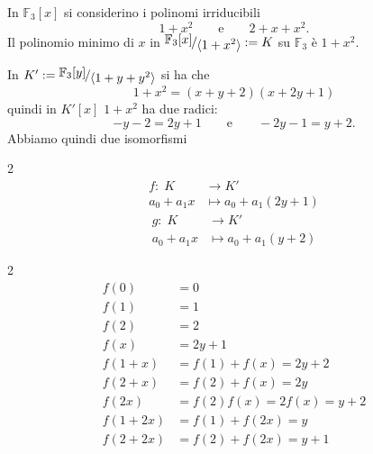 \documentclass[../main.tex]{subfiles}
\begin{document}
\begin{example}
    In $\mathbb{F}_3[x]$ si considerino i polinomi irriducibili
    \begin{equation*}
        1 + x^2 \qquad \text{e} \qquad 2 + x + x^2.
    \end{equation*}
    Il polinomio minimo di $x$ in $\nicefrac{\mathbb{F}_3[x]}{\langle 1 + x^2 \rangle} := K$ su $\mathbb{F}_3$ è $1 + x^2$.

    In $K' := \nicefrac{\mathbb{F}_3[y]}{\langle 1 + y + y^2\rangle}$ si ha che
    \begin{equation*}
        1 + x^2 = (x + y + 2)(x + 2y + 1)
    \end{equation*}
    quindi in $K'[x]$ $1 + x^2$ ha due radici:
    \begin{equation*}
        -y-2 = 2y+1 \qquad \text{e} \qquad -2y - 1 = y + 2.
    \end{equation*}
    Abbiamo quindi due isomorfismi
    \begin{multicols}{2}
        \begin{align*}
            f: \; K    & \rightarrow K'            \\
            a_0 + a_1x & \mapsto a_0 + a_1(2y + 1)
        \end{align*}
        \columnbreak
        \begin{align*}
            g: \; K    & \rightarrow K'           \\
            a_0 + a_1x & \mapsto a_0 + a_1(y + 2)
        \end{align*}
    \end{multicols}
    \begin{multicols}{2}
        \begin{align*}
            f(0)      & = 0                        \\
            f(1)      & = 1                        \\
            f(2)      & = 2                        \\
            f(x)      & = 2y + 1                   \\
            f(1 + x)  & = f(1) + f(x) = 2y + 2     \\
            f(2 + x)  & = f(2) + f(x) = 2y         \\
            f(2x)     & = f(2)f(x) = 2f(x) = y + 2 \\
            f(1 + 2x) & = f(1) + f(2x) = y         \\
            f(2 + 2x) & = f(2) + f(2x) = y + 1
        \end{align*}


\end{multicols}
\end{example}
\end{document}
